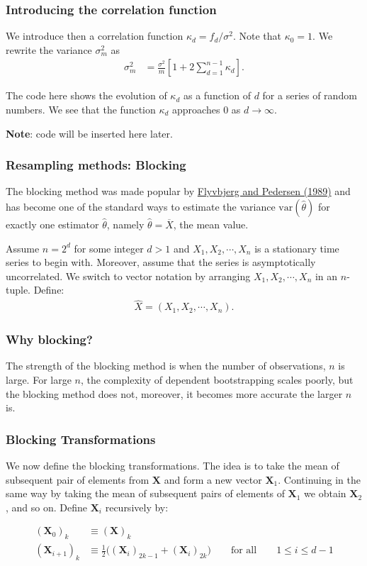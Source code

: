 \documentclass{beamer}
\begin{document}
\begin{frame}
\frametitle{Introducing the correlation function}

We introduce then a correlation function $\kappa_d=f_d/\sigma^2$. Note that $\kappa_0 =1$.  We rewrite the variance $\sigma_m^2$ as
\begin{align*}
\sigma^2_{m}& = \frac{\sigma^2}{m}\left[1+2\sum_{d=1}^{n-1} \kappa_d\right].
\end{align*}

The code here shows the evolution of $\kappa_d$ as a function of $d$ for a series of random numbers. We see that the function $\kappa_d$ approaches $0$ as $d\rightarrow \infty$.

\textbf{Note}: code will be inserted here later.
\end{frame}

\begin{frame}
\frametitle{Resampling methods: Blocking}

The blocking method was made popular by \href{{https://aip.scitation.org/doi/10.1063/1.457480}}{Flyvbjerg and Pedersen (1989)}
and has become one of the standard ways to estimate the variance
$\mathrm{var}(\widehat{\theta})$ for exactly one estimator $\widehat{\theta}$, namely
$\widehat{\theta} = \overline{X}$, the mean value. 

Assume $n = 2^d$ for some integer $d>1$ and $X_1,X_2,\cdots, X_n$ is a stationary time series to begin with. 
Moreover, assume that the series is asymptotically uncorrelated. We switch to vector notation by arranging $X_1,X_2,\cdots,X_n$ in an $n$-tuple. Define:
\begin{align*}
\hat{X} = (X_1,X_2,\cdots,X_n).
\end{align*}
\end{frame}

\begin{frame}
\frametitle{Why blocking?}

The strength of the blocking method is when the number of
observations, $n$ is large. For large $n$, the complexity of dependent
bootstrapping scales poorly, but the blocking method does not,
moreover, it becomes more accurate the larger $n$ is.
\end{frame}

\begin{frame}
\frametitle{Blocking Transformations}

We now define the blocking transformations. The idea is to take the mean of subsequent
pair of elements from $\bm{X}$ and form a new vector
$\bm{X}_1$. Continuing in the same way by taking the mean of
subsequent pairs of elements of $\bm{X}_1$ we obtain $\bm{X}_2$, and
so on. 
Define $\bm{X}_i$ recursively by:

\begin{align} 
(\bm{X}_0)_k &\equiv (\bm{X})_k \nonumber \\
(\bm{X}_{i+1})_k &\equiv \frac{1}{2}\Big( (\bm{X}_i)_{2k-1} +
(\bm{X}_i)_{2k} \Big) \qquad \text{for all} \qquad 1 \leq i \leq d-1
\end{align}
\end{frame}
\end{document}
